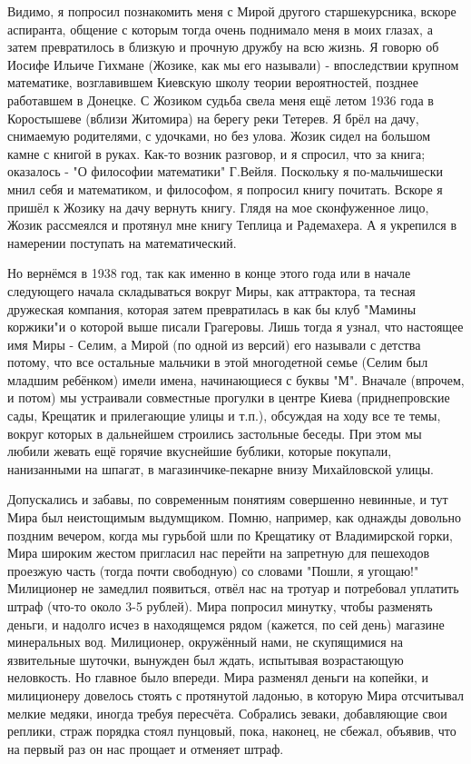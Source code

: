 Видимо, я попросил познакомить меня с Мирой другого старшекурсника, вскоре аспиранта, общение с которым тогда очень поднимало меня в моих глазах, а затем превратилось в близкую и прочную дружбу на всю жизнь. Я говорю об Иосифе Ильиче Гихмане (Жозике, как мы его называли) - впоследствии крупном математике, возглавившем Киевскую школу теории вероятностей, позднее работавшем в Донецке. С Жозиком судьба свела меня ещё летом 1936 года в Коростышеве (вблизи Житомира) на берегу реки Тетерев. Я брёл на дачу, снимаемую родителями, с удочками, но без улова. Жозик сидел на большом камне с книгой в руках. Как-то возник разговор, и я спросил, что за книга; оказалось - "О философии математики" Г.Вейля. Поскольку я по-мальчишески мнил себя и математиком, и философом, я попросил книгу почитать. Вскоре я пришёл к Жозику на дачу вернуть книгу. Глядя на мое сконфуженное лицо, Жозик рассмеялся и протянул мне книгу Теплица и Радемахера. А я укрепился в намерении поступать на математический.

Но вернёмся в 1938 год, так как именно в конце этого года или в начале следующего начала складываться вокруг Миры, как аттрактора, та тесная дружеская компания, которая затем превратилась в как бы клуб "Мамины коржики"и о которой выше писали Грагеровы. Лишь тогда я узнал, что настоящее имя Миры - Селим, а Мирой (по одной из версий) его называли с детства потому, что все остальные мальчики в этой многодетной семье (Селим был младшим ребёнком) имели имена, начинающиеся с буквы "М". Вначале (впрочем, и потом) мы устраивали совместные прогулки в центре Киева (приднепровские сады, Крещатик и прилегающие улицы и т.п.), обсуждая на ходу все те темы, вокруг которых в дальнейшем строились застольные беседы. При этом мы любили жевать ещё горячие вкуснейшие бублики, которые покупали, нанизанными на шпагат, в магазинчике-пекарне внизу Михайловской улицы.

Допускались и забавы, по современным понятиям совершенно невинные, и тут Мира был неистощимым выдумщиком. Помню, например, как однажды довольно поздним вечером, когда мы гурьбой шли по Крещатику от Владимирской горки, Мира широким жестом пригласил нас перейти на запретную для пешеходов проезжую часть (тогда почти свободную) со словами "Пошли, я угощаю!" Милиционер не замедлил появиться, отвёл нас на тротуар и потребовал уплатить штраф (что-то около 3-5 рублей). Мира попросил минутку, чтобы разменять деньги, и надолго исчез в находящемся рядом (кажется, по сей день) магазине минеральных вод. Милиционер, окружённый нами, не скупящимися на язвительные шуточки, вынужден был ждать, испытывая возрастающую неловкость. Но главное было впереди. Мира разменял деньги на копейки, и милиционеру довелось стоять с протянутой ладонью, в которую Мира отсчитывал мелкие медяки, иногда требуя пересчёта. Собрались зеваки, добавляющие свои реплики, страж порядка стоял пунцовый, пока, наконец, не сбежал, объявив, что на первый раз он нас прощает и отменяет штраф.

